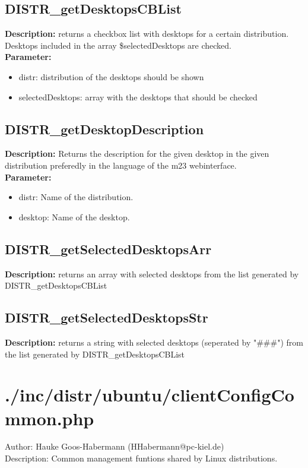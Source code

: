 \subsection{DISTR\_getDesktopsCBList}
\textbf{Description:} returns a checkbox list with desktops for a certain distribution. Desktops included in the array \$selectedDesktops are checked.\\
\textbf{Parameter:}
\begin{itemize}
\item distr: distribution of the desktops should be shown
\item selectedDesktops: array with the desktops that should be checked
\end{itemize}

\subsection{DISTR\_getDesktopDescription}
\textbf{Description:} Returns the description for the given desktop in the given distribution preferedly in the language of the m23 webinterface.\\
\textbf{Parameter:}
\begin{itemize}
\item distr: Name of the distribution.
\item desktop: Name of the desktop.
\end{itemize}

\subsection{DISTR\_getSelectedDesktopsArr}
\textbf{Description:} returns an array with selected desktops from the list generated by DISTR\_getDesktopsCBList\\

\subsection{DISTR\_getSelectedDesktopsStr}
\textbf{Description:} returns a string with selected desktops (seperated by "\#\#\#") from the list generated by DISTR\_getDesktopsCBList\\

\newpage\section{./inc/distr/ubuntu/clientConfigCommon.php}
 Author: Hauke Goos-Habermann (HHabermann@pc-kiel.de)\\
 Description: Common management funtions shared by Linux distributions.\\

